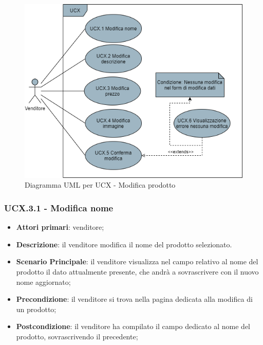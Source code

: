 \begin{figure}[H]
\centering
\includegraphics[scale=0.6]{res/UseCase/Immagini/ModificaProdotto}
\caption{Diagramma UML per UCX - Modifica prodotto}
\end{figure}

\subsubsection{UCX.3.1 - Modifica nome}
\begin{itemize}
\item \textbf{Attori primari}: venditore;
\item \textbf{Descrizione}: il venditore modifica il nome del prodotto selezionato.
\item \textbf{Scenario Principale}: il venditore visualizza nel campo relativo al nome del prodotto il dato attualmente presente, che andrà a sovrascrivere con il nuovo nome aggiornato;
\item \textbf{Precondizione}: il venditore si trova nella pagina dedicata alla modifica di un prodotto;
\item \textbf{Postcondizione}: il venditore ha compilato il campo dedicato al nome del prodotto, sovrascrivendo il precedente;
\end{itemize}

